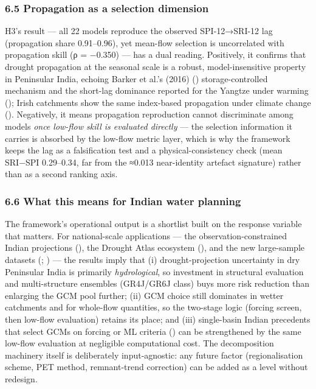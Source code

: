 \documentclass[
  english,
  11pt,
]{article}
\begin{document}
\subsubsection{6.5 Propagation as a selection
dimension}\label{propagation-as-a-selection-dimension}

H3's result --- all 22 models reproduce the observed SPI-12→SRI-12 lag
(propagation share 0.91--0.96), yet mean-flow selection is uncorrelated
with propagation skill (ρ = −0.350) --- has a dual reading. Positively,
it confirms that drought propagation at the seasonal scale is a robust,
model-insensitive property in Peninsular India, echoing Barker et al.'s
(2016) ()
storage-controlled mechanism and the short-lag dominance reported for
the Yangtze under warming (); Irish catchments show the same index-based propagation under
climate change ().
Negatively, it means propagation reproduction cannot discriminate among
models \emph{once low-flow skill is evaluated directly} --- the
selection information it carries is absorbed by the low-flow metric
layer, which is why the framework keeps the lag as a falsification test
and a physical-consistency check (mean \textbar SRI−SPI\textbar{}
0.29--0.34, far from the ≈0.013 near-identity artefact signature) rather
than as a second ranking axis.

\subsubsection{6.6 What this means for Indian water
planning}\label{what-this-means-for-indian-water-planning}

The framework's operational output is a shortlist built on the response
variable that matters. For national-scale applications --- the
observation-constrained Indian projections
(), the
Drought Atlas ecosystem (), and the new large-sample datasets
(;
) --- the results
imply that (i) drought-projection uncertainty in dry Peninsular India is
primarily \emph{hydrological}, so investment in structural evaluation
and multi-structure ensembles (GR4J/GR6J class) buys more risk reduction
than enlarging the GCM pool further; (ii) GCM choice still dominates in
wetter catchments and for whole-flow quantities, so the two-stage logic
(forcing screen, then low-flow evaluation) retains its place; and (iii)
single-basin Indian precedents that select GCMs on forcing or ML
criteria () can
be strengthened by the same low-flow evaluation at negligible
computational cost. The decomposition machinery itself is deliberately
input-agnostic: any future factor (regionalisation scheme, PET method,
remnant-trend correction) can be added as a level without redesign.
\end{document}
